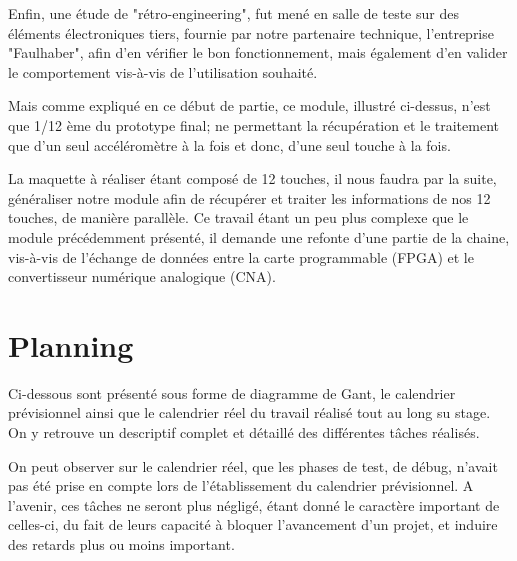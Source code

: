 \documentclass[french,a4paper,12pt]{report}
\begin{document}
	Enfin, une étude de "rétro-engineering", fut mené en salle de teste sur des éléments électroniques tiers, fournie par notre partenaire technique, l'entreprise "Faulhaber", afin d'en vérifier le bon fonctionnement, mais également d'en valider le comportement vis-à-vis de l'utilisation souhaité.
	
	Mais comme expliqué en ce début de partie, ce module, illustré ci-dessus, n'est que 1/12 ème du prototype final; ne permettant la récupération et le traitement que d'un seul accéléromètre à la fois et donc, d'une seul touche à la fois.
	
	La maquette à réaliser étant composé de 12 touches, il nous faudra par la suite, généraliser notre module afin de récupérer et traiter les informations de nos 12 touches, de manière parallèle.
	Ce travail étant un peu plus complexe que le module précédemment présenté, il demande une refonte d'une partie de la chaine, vis-à-vis de l'échange de données entre la carte programmable (FPGA) et le convertisseur numérique analogique (CNA).
	
	\chapter{Planning}

	Ci-dessous sont présenté sous forme de diagramme de Gant, le calendrier prévisionnel ainsi que le calendrier réel du travail réalisé tout au long su stage.
	On y retrouve un descriptif complet et détaillé des différentes tâches réalisés.
	
	On peut observer sur le calendrier réel, que les phases de test, de débug, n'avait pas été prise en compte lors de l'établissement du calendrier prévisionnel.
	A l'avenir, ces tâches ne seront plus négligé, étant donné le caractère important de celles-ci, du fait de leurs capacité à bloquer l'avancement d'un projet, et induire des retards plus ou moins important.
	
	
	
	
	
		
	
	
	
	
%
%
\end{document}
